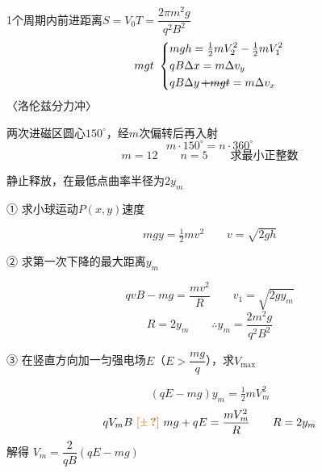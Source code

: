 1个周期内前进距离\quad$S=V_0T=\dfrac{2\pi m^2g}{q^2B^2}$
\[
mgt\ \left\{\begin{aligned}
&mgh=\tfrac12mV_2^2-\tfrac12mV_1^2\\
&qB\Delta x=m\Delta v_y\\
&qB\Delta y\,\text{\struck{$+mgt$}}=m\Delta v_x
\end{aligned}\right.
\]
〈洛伦兹分力冲〉 %
\begin{keybox}[圆约束]
两次进磁区圆心$150^\circ$，经$m$次偏转后再入射
\[ m\cdot150^\circ=n\cdot360^\circ \]
\[ m=12\qquad n=5\qquad \text{求最小正整数} \]
\end{keybox}
\begin{problem}
静止释放，在最低点曲率半径为$2y_m$ %

① 求小球运动$P(x,y)$速度
\begin{solution}
\[ mgy=\tfrac12mv^2\qquad v=\sqrt{2gh} \]
\end{solution}
② 求第一次下降的最大距离$y_m$
\begin{solution}
\[ qvB-mg=\frac{mv^2}{R}\qquad v_1=\sqrt{2gy_m} \]
\[ R=2y_m\qquad \therefore y_m=\frac{2m^2g}{q^2B^2} \]
\end{solution}
③ 在竖直方向加一匀强电场$E$（$E>\dfrac{mg}{q}$），求$V_{\max}$ %
\begin{solution}
\[ (qE-mg)y_m=\tfrac12mV_m^2 \]
\[ qV_mB\ \unclear{\pm}\ mg+qE=\frac{mV_m^2}{R}\qquad R=2y_m \] %
解得 $V_m=\dfrac{2}{qB}(qE-mg)$
\end{solution}
\end{problem}
